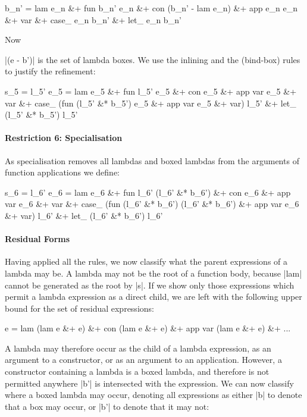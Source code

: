 \ignore\begin{code}
b_n'  =  lam e_n &+ fun b_n' e_n &+ con (b_n' - lam e_n) &+ app e_n e_n &+ var &+
         case_ e_n b_n' &+ let_ e_n b_n'
\end{code}

Now \ignore|(e - b')| is the set of lambda boxes. We use the inlining and the (bind-box) rules to justify the refinement:

\ignore\begin{code}
s_5   =  l_5'
e_5   =  lam e_5 &+ fun l_5' e_5 &+ con e_5 &+ app var e_5 &+ var &+
         case_ (fun (l_5' &* b_5') e_5 &+ app var e_5 &+ var) l_5' &+
         let_ (l_5' &* b_5') l_5'
\end{code}

\paragraph{Restriction 6: Specialisation}
As specialisation removes all lambdas and boxed lambdas from the arguments of function applications we define:

\ignore\begin{code}
s_6  =  l_6'
e_6  =  lam e_6 &+ fun l_6' (l_6' &* b_6') &+ con e_6 &+ app var e_6 &+ var &+
        case_ (fun (l_6' &* b_6') (l_6' &* b_6') &+ app var e_6 &+ var) l_6' &+
        let_ (l_6' &* b_6') l_6'
\end{code}

\paragraph{Residual Forms}
Having applied all the rules, we now classify what the parent expressions of a lambda may be. A lambda may not be the root of a function body, because |lam| cannot be generated as the root by |s|. If we show only those expressions which permit a lambda expression as a direct child, we are left with the following upper bound for the set of residual expressions:

\ignore\begin{code}
e =  lam (lam e &+ e) &+ con (lam e &+ e) &+
     app var (lam e &+ e) &+ ...
\end{code}

A lambda may therefore occur as the child of a lambda expression, as an argument to a constructor, or as an argument to an application. However, a constructor containing a lambda is a boxed lambda, and therefore is not permitted anywhere |b'| is intersected with the expression. We can now classify where a boxed lambda may occur, denoting all expressions as either |b| to denote that a box may occur, or |b'| to denote that it may not:

